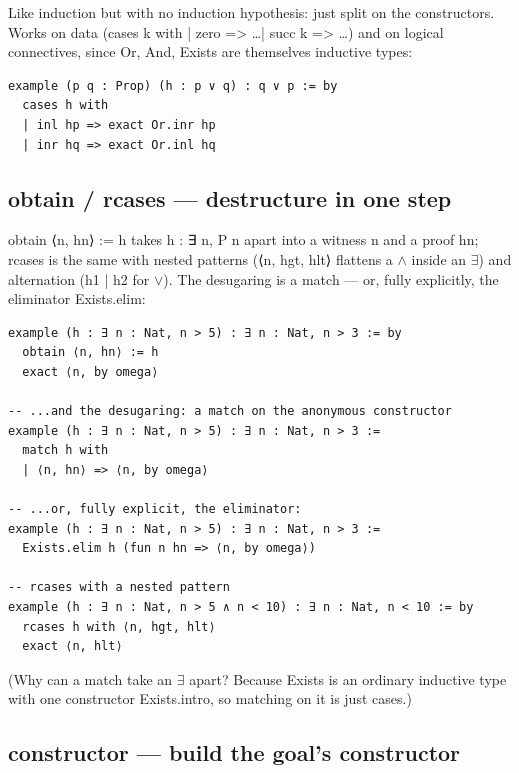 \documentclass[12pt, openany]{book}
\theoremstyle{plain}
\theoremstyle{definition}
\theoremstyle{remark}
\newcommand{\li}[1]{{\ttfamily\small\color{tealaccent}#1}}
\begin{document}
Like \li{induction} but with no induction hypothesis: just split on the constructors.  Works on data (\li{cases k with | zero => \ldots | succ k => \ldots}) and on logical connectives, since \li{Or}, \li{And}, \li{Exists} are themselves inductive types:

\begin{leanbox}
\begin{lstlisting}
example (p q : Prop) (h : p ∨ q) : q ∨ p := by
  cases h with
  | inl hp => exact Or.inr hp
  | inr hq => exact Or.inl hq
\end{lstlisting}
\end{leanbox}
\color{black}

\subsection*{\li{obtain} / \li{rcases} --- destructure in one step}

\li{obtain ⟨n, hn⟩ := h} takes \li{h : ∃ n, P n} apart into a witness \li{n} and a proof \li{hn}; \li{rcases} is the same with nested patterns (\li{⟨n, hgt, hlt⟩} flattens a $\land$ inside an $\exists$) and alternation (\li{h1 | h2} for $\lor$).  The desugaring is a \li{match} --- or, fully explicitly, the eliminator \li{Exists.elim}:

\begin{leanbox}
\begin{lstlisting}
example (h : ∃ n : Nat, n > 5) : ∃ n : Nat, n > 3 := by
  obtain ⟨n, hn⟩ := h
  exact ⟨n, by omega⟩

-- ...and the desugaring: a match on the anonymous constructor
example (h : ∃ n : Nat, n > 5) : ∃ n : Nat, n > 3 :=
  match h with
  | ⟨n, hn⟩ => ⟨n, by omega⟩

-- ...or, fully explicit, the eliminator:
example (h : ∃ n : Nat, n > 5) : ∃ n : Nat, n > 3 :=
  Exists.elim h (fun n hn => ⟨n, by omega⟩)

-- rcases with a nested pattern
example (h : ∃ n : Nat, n > 5 ∧ n < 10) : ∃ n : Nat, n < 10 := by
  rcases h with ⟨n, hgt, hlt⟩
  exact ⟨n, hlt⟩
\end{lstlisting}
\end{leanbox}
\color{black}

(Why can a \li{match} take an $\exists$ apart?  Because \li{Exists} is an ordinary inductive type with one constructor \li{Exists.intro}, so matching on it is just \li{cases}.)

\subsection*{\li{constructor} --- build the goal's constructor}
\end{document}
